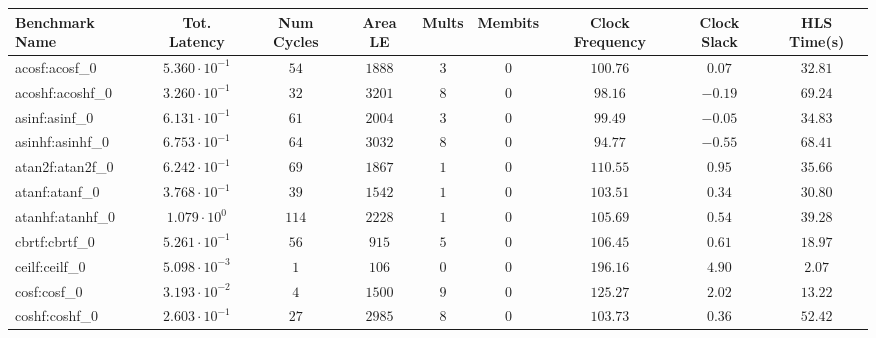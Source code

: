 \begin{tabular}{|l|c|c|c|c|c|c|c|c|}
\hline
Benchmark Name               & Tot. Latency            & Num Cycles & Area LE   & Mults   & Membits    & Clock Frequency & Clock Slack & HLS Time(s) \\
\hline
acosf:acosf\_0               & $ 5.360 \cdot 10^{-1} $ & $ 54     $ & $ 1888  $ & $ 3   $ & $ 0      $ & $ 100.76      $ & $ 0.07    $ & $ 32.81   $ \\
acoshf:acoshf\_0             & $ 3.260 \cdot 10^{-1} $ & $ 32     $ & $ 3201  $ & $ 8   $ & $ 0      $ & $ 98.16       $ & $ -0.19   $ & $ 69.24   $ \\
asinf:asinf\_0               & $ 6.131 \cdot 10^{-1} $ & $ 61     $ & $ 2004  $ & $ 3   $ & $ 0      $ & $ 99.49       $ & $ -0.05   $ & $ 34.83   $ \\
asinhf:asinhf\_0             & $ 6.753 \cdot 10^{-1} $ & $ 64     $ & $ 3032  $ & $ 8   $ & $ 0      $ & $ 94.77       $ & $ -0.55   $ & $ 68.41   $ \\
atan2f:atan2f\_0             & $ 6.242 \cdot 10^{-1} $ & $ 69     $ & $ 1867  $ & $ 1   $ & $ 0      $ & $ 110.55      $ & $ 0.95    $ & $ 35.66   $ \\
atanf:atanf\_0               & $ 3.768 \cdot 10^{-1} $ & $ 39     $ & $ 1542  $ & $ 1   $ & $ 0      $ & $ 103.51      $ & $ 0.34    $ & $ 30.80   $ \\
atanhf:atanhf\_0             & $ 1.079 \cdot 10^{0}  $ & $ 114    $ & $ 2228  $ & $ 1   $ & $ 0      $ & $ 105.69      $ & $ 0.54    $ & $ 39.28   $ \\
cbrtf:cbrtf\_0               & $ 5.261 \cdot 10^{-1} $ & $ 56     $ & $ 915   $ & $ 5   $ & $ 0      $ & $ 106.45      $ & $ 0.61    $ & $ 18.97   $ \\
ceilf:ceilf\_0               & $ 5.098 \cdot 10^{-3} $ & $ 1      $ & $ 106   $ & $ 0   $ & $ 0      $ & $ 196.16      $ & $ 4.90    $ & $ 2.07    $ \\
cosf:cosf\_0                 & $ 3.193 \cdot 10^{-2} $ & $ 4      $ & $ 1500  $ & $ 9   $ & $ 0      $ & $ 125.27      $ & $ 2.02    $ & $ 13.22   $ \\
coshf:coshf\_0               & $ 2.603 \cdot 10^{-1} $ & $ 27     $ & $ 2985  $ & $ 8   $ & $ 0      $ & $ 103.73      $ & $ 0.36    $ & $ 52.42   $ \\

\end{tabular}
